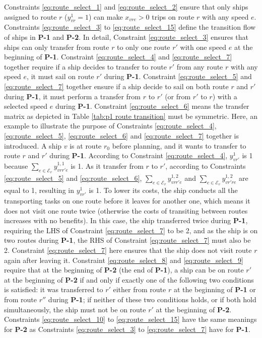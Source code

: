 \documentclass[11pt,english]{article}
\begin{document}
Constraints \eqref{eq:route_select_1} and \eqref{eq:route_select_2} ensure that only ships assigned to route $r$ ($y_{vr}^1=1$) can make $x_{vre}>0$ trips on route $r$ with any speed $e$. Constraints \eqref{eq:route_select_3} to \eqref{eq:route_select_15} define the transition flow of ships in \textbf{P-1} and \textbf{P-2}. In detail, Constraint \eqref{eq:route_select_3} ensures that ships can only transfer from route $r$ to only one route $r'$ with one speed $e$ at the beginning of \textbf{P-1}. Constraint \eqref{eq:route_select_4} and \eqref{eq:route_select_7} together require if a ship decides to transfer to route $r'$ from any route $r$ with any speed $e$, it must sail on route $r'$ during \textbf{P-1}. Constraint \eqref{eq:route_select_5} and \eqref{eq:route_select_7} together ensure if a ship decide to sail on both route $r$ and $r'$ during \textbf{P-1}, it must perform a transfer from $r$ to $r'$ (or from $r'$ to $r$) with a selected speed $e$ during \textbf{P-1}. Constraint \eqref{eq:route_select_6} means the transfer matrix as depicted in Table \ref{tab:p1 route transition} must be symmetric. Here, an example to illustrate the purpose of Constraints \eqref{eq:route_select_4}, \eqref{eq:route_select_5}, \eqref{eq:route_select_6} and \eqref{eq:route_select_7} together is introduced. A ship $v$ is at route $r_0$ before planning, and it wants to transfer to route $r$ and $r'$ during \textbf{P-1}. According to Constraint \eqref{eq:route_select_4}, $y^1_{vr'}$ is 1 because $\sum_{e\in\mathcal{E}_v}y^{1,1}_{vrr'e}$ is 1. As it transfer from $r$ to $r'$, according to Constraints \eqref{eq:route_select_5} and \eqref{eq:route_select_6}, $\sum_{e\in\mathcal{E}_v}y^{1,2}_{vrr'e}$ and $\sum_{e\in\mathcal{E}_v}y^{1,2}_{vr're}$ are equal to 1, resulting in $y^1_{vr'}$ is 1. To lower its costs, the ship conducts all the transporting tasks on one route before it leaves for another one, which means it does not visit one route twice (otherwise the costs of transiting between routes increases with no benefits). In this case, the ship transferred twice during \textbf{P-1}, requiring the LHS of Constraint \eqref{eq:route_select_7} to be 2, and as the ship is on two routes during \textbf{P-1}, the RHS of Constraint \eqref{eq:route_select_7} must also be 2. Constraint \eqref{eq:route_select_7} here ensures that the ship does not visit route $r$ again after leaving it. Constraint \eqref{eq:route_select_8} and \eqref{eq:route_select_9} require that at the beginning of \textbf{P-2} (the end of \textbf{P-1}), a ship can be on route $r'$ at the beginning of \textbf{P-2} if and only if exactly one of the following two conditions is satisfied: it was transferred to $r'$ either from route $r$ at the beginning of \textbf{P-1} or from route $r''$ during \textbf{P-1}; if neither of these two conditions holds, or if both hold simultaneously, the ship must not be on route $r'$ at the beginning of \textbf{P-2}. Constraints \eqref{eq:route_select_10} to \eqref{eq:route_select_15} have the same meanings for \textbf{P-2} as Constraints \eqref{eq:route_select_3} to \eqref{eq:route_select_7} have for \textbf{P-1}. 
\end{document}
